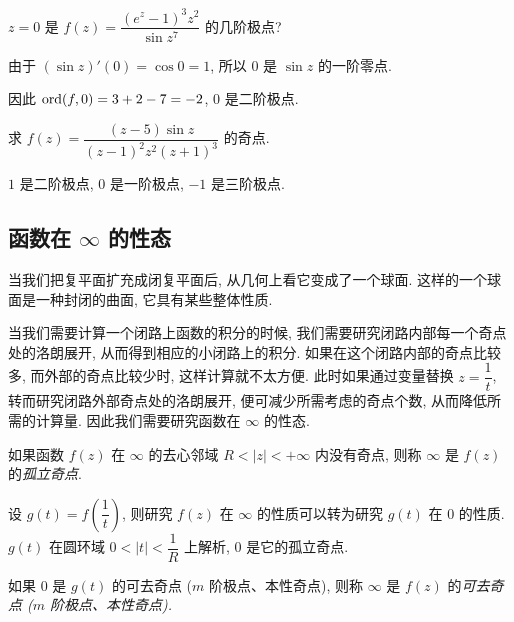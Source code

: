 \documentclass[nocolor,theme=doremi,lang=cn,11pt,chinese,twoside,openright,usesamecnt]{elegantbook}
\begin{document}
\begin{example}
	$z=0$ 是 $f(z)=\dfrac{(e^z-1)^3z^2}{\sin z^7}$ 的几阶极点?
\end{example}

\begin{solution}
		由于 $(\sin z)'(0)=\cos 0=1$, 所以 $0$ 是 $\sin z$ 的一阶零点.

	{因此 ${\mathrm{ord}}(f,0)=3+2-7=-2$, $0$ 是二阶极点.
	}
\end{solution}

\begin{exercise}
	求 $f(z)=\dfrac{(z-5)\sin z}{(z-1)^2z^2(z+1)^3}$ 的奇点.
\end{exercise}

\begin{answer}
	$1$ 是二阶极点, $0$ 是一阶极点, $-1$ 是三阶极点.
\end{answer}

\subsection{函数在 \texorpdfstring{$\infty$}{∞} 的性态}

当我们把复平面扩充成闭复平面后, 从几何上看它变成了一个球面.
这样的一个球面是一种封闭的曲面, 它具有某些整体性质.

当我们需要计算一个闭路上函数的积分的时候,
我们需要研究闭路内部每一个奇点处的洛朗展开,
从而得到相应的小闭路上的积分.
如果在这个闭路内部的奇点比较多, 而外部的奇点比较少时, 这样计算就不太方便.
此时如果通过变量替换 $z=\dfrac1t$, 转而研究闭路外部奇点处的洛朗展开,
便可减少所需考虑的奇点个数, 从而降低所需的计算量.
因此我们需要研究函数在 $\infty$ 的性态.

\begin{definition}
	如果函数 $f(z)$ 在 $\infty$ 的去心邻域 $R<|z|<+\infty$ 内没有奇点, 则称 $\infty$ 是 $f(z)$ 的\emph{孤立奇点}.
\end{definition}

设 $g(t)=f\left(\dfrac1t\right)$, 则研究 $f(z)$ 在 $\infty$ 的性质可以转为研究 $g(t)$ 在 $0$ 的性质.
$g(t)$ 在圆环域 $0<|t|<\dfrac1R$ 上解析, $0$ 是它的孤立奇点.

\begin{definition}
	如果 $0$ 是 $g(t)$ 的可去奇点 ($m$ 阶极点、本性奇点), 则称 $\infty$ 是 $f(z)$ 的\emph{可去奇点 ($m$ 阶极点、本性奇点).}
\end{definition}
\end{document}
